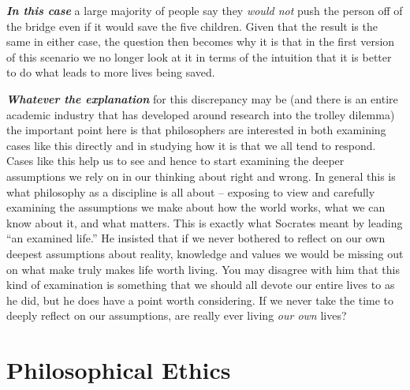 \documentclass[12pt, openany]{book}
\begin{document}
\textbf{\emph{In this case}} a large majority of people say they \emph{would not} push the person off of the bridge even if it would save the five children. Given that the result is the same in either case, the question then becomes why it is that in the first version of this scenario we no longer look at it in terms of the intuition that it is better to do what leads to more lives being saved.

\textbf{\emph{Whatever the explanation}} for this discrepancy may be (and there is an entire academic industry that has developed around research into the trolley dilemma) the important point here is that philosophers are interested in both examining cases like this directly and in studying how it is that we all tend to respond. Cases like this help us to see and hence to start examining the deeper assumptions we rely on in our thinking about right and wrong. In general this is what philosophy as a discipline is all about -- exposing to view and carefully examining the assumptions we make about how the world works, what we can know about it, and what matters. This is exactly what Socrates meant by leading ``an examined life.'' He insisted that if we never bothered to reflect on our own deepest assumptions about reality, knowledge and values we would be missing out on what make truly makes life worth living. You may disagree with him that this kind of examination is something that we should all devote our entire lives to as he did, but he does have a point worth considering. If we never take the time to deeply reflect on our assumptions, are really ever living \emph{our own} lives?

\hypertarget{philosophical-ethics}{%
\section{Philosophical Ethics}\label{philosophical-ethics}}
\end{document}
